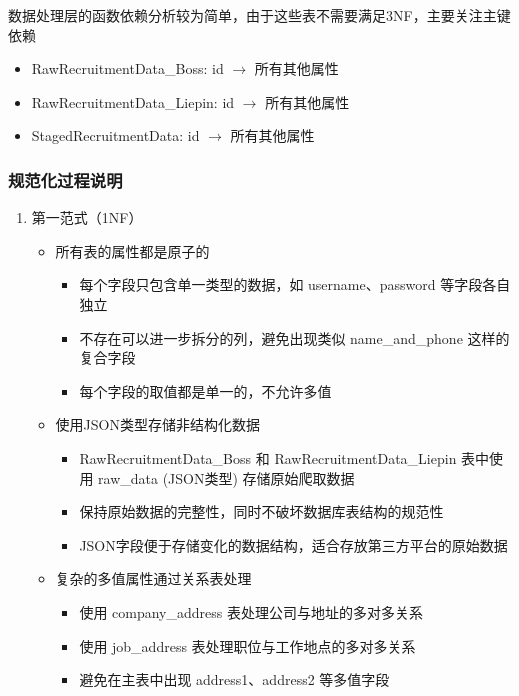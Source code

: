数据处理层的函数依赖分析较为简单，由于这些表不需要满足3NF，主要关注主键依赖

\begin{itemize}
    \item RawRecruitmentData\_Boss: id $\rightarrow$ 所有其他属性
    \item RawRecruitmentData\_Liepin: id $\rightarrow$ 所有其他属性
    \item StagedRecruitmentData: id $\rightarrow$ 所有其他属性
\end{itemize}

\subsubsection{规范化过程说明}

\begin{enumerate}
  \item 第一范式（1NF）
  \begin{itemize}
      \item 所有表的属性都是原子的
    \begin{itemize}
      \item 每个字段只包含单一类型的数据，如 username、password 等字段各自独立
      \item 不存在可以进一步拆分的列，避免出现类似 name\_and\_phone 这样的复合字段
      \item 每个字段的取值都是单一的，不允许多值
    \end{itemize}
    
    \item 使用JSON类型存储非结构化数据
    \begin{itemize}
      \item RawRecruitmentData\_Boss 和 RawRecruitmentData\_Liepin 表中使用 raw\_data (JSON类型) 存储原始爬取数据
      \item 保持原始数据的完整性，同时不破坏数据库表结构的规范性
      \item JSON字段便于存储变化的数据结构，适合存放第三方平台的原始数据
    \end{itemize}

    \item 复杂的多值属性通过关系表处理
    \begin{itemize}
      \item 使用 company\_address 表处理公司与地址的多对多关系
      \item 使用 job\_address 表处理职位与工作地点的多对多关系
      \item 避免在主表中出现 address1、address2 等多值字段
    \end{itemize}
  \end{itemize}


\end{enumerate}
